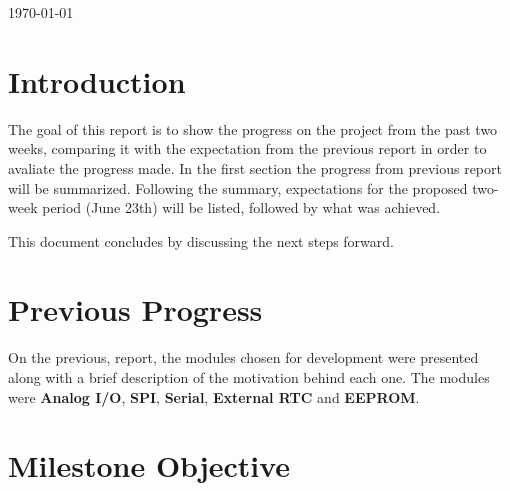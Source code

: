 \documentclass{article}
\begin{document}
\begin{titlepage}

{\large \today}\\[3cm] %


 

\vfill %

\end{titlepage}

\tableofcontents{}

\newpage

\section{Introduction}	


\tab The goal of this report is to show the progress on the project from the past two weeks, comparing it with the expectation from the previous report in order to avaliate the progress made. In the first section the progress from previous report will be summarized. Following the summary, expectations for the proposed two-week period (June 23th) will be listed, followed by what was achieved.
\par This document concludes by discussing the next steps forward.

\section{Previous Progress}
\tab On the previous, report, the modules chosen for development were presented along with a brief description of the motivation behind each one. The modules were \textbf{Analog I/O}, \textbf{SPI}, \textbf{Serial}, \textbf{External RTC} and \textbf{EEPROM}.

\section{Milestone Objective}
\end{document}
